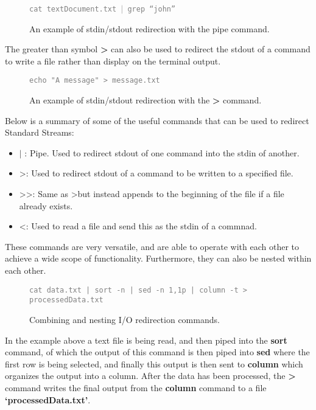 \documentclass{article}
\begin{document}
\begin{figure}[h]
    \label{Using the Pipe Command}
    \textcolor{grey}{
      \texttt{cat textDocument.txt $\vert$ grep ``john''}
    }
    \caption{An example of stdin/stdout redirection with the pipe command.}
\end{figure}

The greater than symbol \textbf{\textgreater} can also be used to redirect the stdout of a command to write a file rather than display on the terminal output.

\begin{figure}[h]
    \label{Redirecting stdout to write files}
    \textcolor{grey}{
      \texttt{echo "A message" > message.txt}
    }
    \caption{An example of stdin/stdout redirection with the \textbf{\textgreater} command.}
\end{figure}

Below is a summary of some of the useful commands that can be used to redirect Standard Streams:

      \begin{itemize}
        \item $\vert$ : Pipe. Used to redirect stdout of one command into the stdin of another.
        \item \textgreater : Used to redirect stdout of a command to be written to a specified file.
        \item \textgreater\textgreater : Same as \textgreater but instead appends to the beginning of the file if a file already exists.
        \item \textless : Used to read a file and send this as the stdin of a commnad.
      \end{itemize}

These commands are very versatile, and are able to operate with each other to achieve a wide scope of functionality. Furthermore, they can
also be nested within each other.

\begin{figure}[h]
    \label{Nesting and combining Standard I/O commands}
    \textcolor{grey}{
      \texttt{cat data.txt | sort -n | sed -n 1,1p | column -t > processedData.txt}
    }
    \caption{Combining and nesting I/O redirection commands.}
\end{figure}

In the example above a text file is being read, and then piped into the \textbf{sort} command, of which the output of this command is then piped into
\textbf{sed} where the first row is being selected, and finally this output is then sent to \textbf{column} which organizes the output into a column. After
the data has been processed, the \textbf{\textgreater} command writes the final output from the \textbf{column} command to a file \textbf{`processedData.txt'}.
\end{document}
